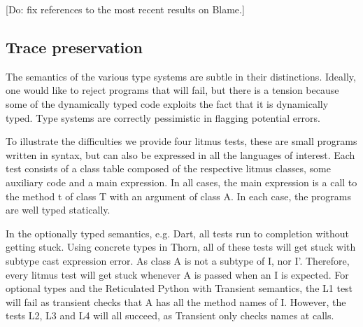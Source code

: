 \documentclass[a4paper,USenglish]{tex/lipics-v2016}
\begin{document}
[Do: fix references to the most recent results on Blame.]

\subsection{Trace preservation}

The semantics of the various type systems are subtle in their distinctions. Ideally,
one would like to reject programs that will fail, but there is a tension
because some of the dynamically typed code exploits the fact that it is
dynamically typed.  Type systems are correctly pessimistic in flagging
potential errors.

To illustrate the difficulties we provide four litmus tests, these are small
programs written in \kafka syntax, but can also be expressed in all the
languages of interest. Each test consists of a class table 
composed of the respective litmus classes, some auxiliary code and a main expression.
In all cases, the main expression is a call to the method t of class T with 
an argument of class A. In each case, the programs are well typed statically.

In the optionally typed semantics, e.g. Dart, all tests run to
completion without getting stuck. Using concrete types in Thorn, 
all of these tests will get stuck with subtype cast expression error. 
As class A is not a subtype of I, nor I'. Therefore, every litmus test will 
get stuck whenever A is passed when an I is expected.
For optional types and the Reticulated Python with Transient semantics, 
the L1 test will fail as transient checks that A has all the method names of I. 
However, the tests L2, L3 and L4 will all succeed, as Transient only checks names at calls.
\end{document}

